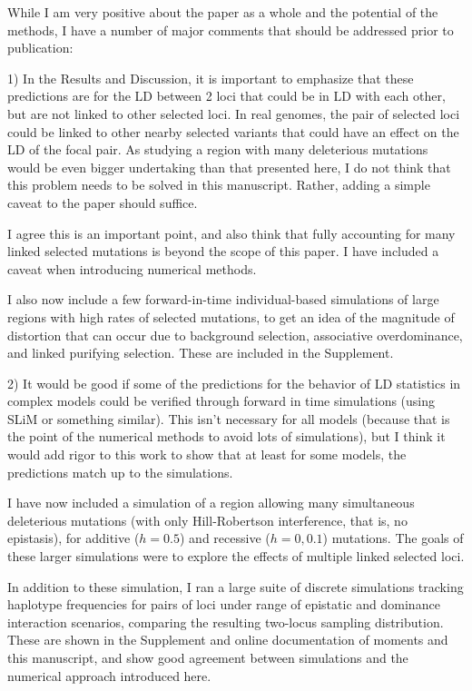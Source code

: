 \documentclass{article}
\newenvironment{response}%
  {\list{}{\leftmargin=0.5in\rightmargin=0.5in\color{blue}}\item[]}%
  {\endlist}
\begin{document}
While I am very positive about the paper as a whole and the potential of the
methods, I have a number of major comments that should be addressed prior to
publication:

1) In the Results and Discussion, it is important to emphasize that these
predictions are for the LD between 2 loci that could be in LD with each other,
but are not linked to other selected loci. In real genomes, the pair of
selected loci could be linked to other nearby selected variants that could have
an effect on the LD of the focal pair. As studying a region with many
deleterious mutations would be even bigger undertaking than that presented
here, I do not think that this problem needs to be solved in this manuscript.
Rather, adding a simple caveat to the paper should suffice.

\begin{response}
    I agree this is an important point, and also think that fully accounting
    for many linked selected mutations is beyond the scope of this paper. I have
    included a caveat when introducing numerical methods.

    I also now include a few forward-in-time individual-based simulations
    of large regions with high rates of selected mutations, to get an idea of the
    magnitude of distortion that can occur due to background selection, associative
    overdominance, and linked purifying selection. These are included in the Supplement.
\end{response}

2) It would be good if some of the predictions for the behavior of LD
statistics in complex models could be verified through forward in time
simulations (using SLiM or something similar). This isn't necessary for all
models (because that is the point of the numerical methods to avoid lots of
simulations), but I think it would add rigor to this work to show that at least
for some models, the predictions match up to the simulations.

\begin{response}
    I have now included a simulation of a region allowing many simultaneous
    deleterious mutations (with only Hill-Robertson interference, that is,
    no epistasis), for additive ($h=0.5$) and recessive ($h=0, 0.1$) mutations.
    The goals of these larger simulations were to explore the effects of multiple
    linked selected loci.

    In addition to these simulation, I ran a large suite of discrete simulations
    tracking haplotype frequencies for pairs of loci under range of epistatic
    and dominance interaction scenarios, comparing the resulting two-locus
    sampling distribution. These are shown in the Supplement and online
    documentation of moments and this manuscript, and show good agreement between
    simulations and the numerical approach introduced here.
\end{response}
\end{document}
